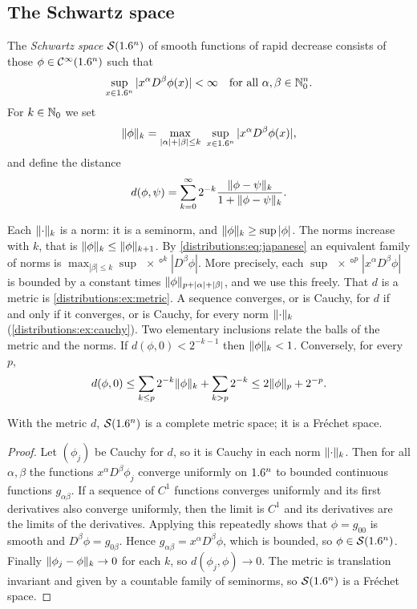 \subsection{The Schwartz space}
\begin{definition}\label{distributions:def:schwartz}
The \emph{Schwartz space} $\mathcal{S}(1.6^n)$ of smooth functions of rapid decrease consists of
those $\phi\in\mathcal{C}^\infty(1.6^n)$ such that
\[
  \sup_{x\in1.6^n}|x^\alpha D^\beta\phi(x)|<\infty\quad\text{for all }\alpha,\beta\in\mathbb{N}_0^n.
\]
For $k\in\mathbb{N}_0$ we set
\begin{equation}\label{distributions:eq:norms}
  \lVert \phi\rVert_k=\max_{|\alpha|+|\beta|\le k}\ \sup_{x\in1.6^n}|x^\alpha D^\beta\phi(x)|,
\end{equation}
and define the distance
\begin{equation}\label{distributions:eq:metric}
  d(\phi,\psi)=\sum_{k=0}^\infty 2^{-k}\frac{\lVert \phi-\psi\rVert_k}{1+\lVert \phi-\psi\rVert_k}.
\end{equation}
\end{definition}

Each $\lVert \cdot\rVert_k$ is a norm: it is a seminorm, and $\lVert \phi\rVert_k\ge\sup|\phi|$.
The norms increase with $k$, that is $\lVert \phi\rVert_k\le\lVert \phi\rVert_{k+1}$. By
\eqref{distributions:eq:japanese} an equivalent family of norms is
$\max_{|\beta|\le k}\sup\ang{x}^k|D^\beta\phi|$. More precisely, each
$\sup\ang{x}^p|x^\alpha D^\beta\phi|$ is bounded by a constant times
$\lVert \phi\rVert_{p+|\alpha|+|\beta|}$, and we use this freely. That $d$ is a metric is
\cref{distributions:ex:metric}. A sequence converges, or is Cauchy, for $d$ if and only
if it converges, or is Cauchy, for every norm $\lVert \cdot\rVert_k$
(\cref{distributions:ex:cauchy}). Two elementary inclusions relate the balls of the
metric and the norms. If $d(\phi,0)<2^{-k-1}$ then $\lVert \phi\rVert_k<1$. Conversely, for
every $p$,
\begin{equation}\label{distributions:eq:ball}
  d(\phi,0)\le\sum_{k\le p}2^{-k}\lVert \phi\rVert_k+\sum_{k>p}2^{-k}\le 2\lVert \phi\rVert_p+2^{-p}.
\end{equation}

\begin{proposition}\label{distributions:prop:frechet}
With the metric $d$, $\mathcal{S}(1.6^n)$ is a complete metric space; it is a Fr\'echet space.
\end{proposition}
\begin{proof}
Let $(\phi_j)$ be Cauchy for $d$, so it is Cauchy in each norm $\lVert \cdot\rVert_k$. Then for
all $\alpha,\beta$ the functions $x^\alpha D^\beta\phi_j$ converge uniformly on $1.6^n$ to
bounded continuous functions $g_{\alpha\beta}$. If a sequence of $C^1$ functions
converges uniformly and its first derivatives also converge uniformly, then the limit is
$C^1$ and its derivatives are the limits of the derivatives. Applying this repeatedly
shows that $\phi=g_{00}$ is smooth and $D^\beta\phi=g_{0\beta}$. Hence
$g_{\alpha\beta}=x^\alpha D^\beta\phi$, which is bounded, so $\phi\in\mathcal{S}(1.6^n)$. Finally
$\lVert \phi_j-\phi\rVert_k\to0$ for each $k$, so $d(\phi_j,\phi)\to0$. The metric is
translation invariant and given by a countable family of seminorms, so $\mathcal{S}(1.6^n)$ is a
Fr\'echet space.
\end{proof}

